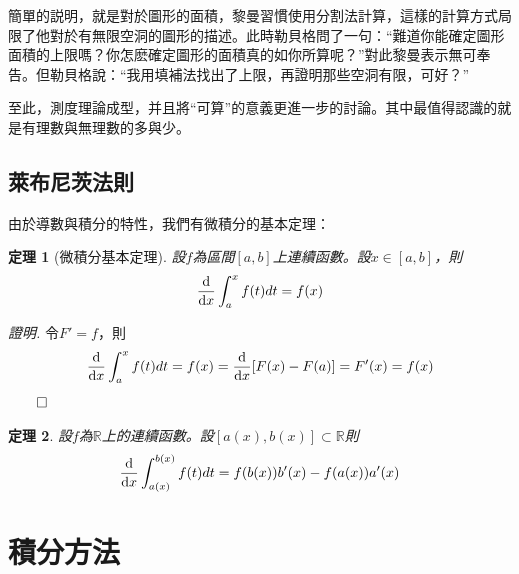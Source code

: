 \documentclass[12pt]{article}
\newtheorem*{theorem}{定理}
\renewenvironment*{proof}{\textit{證明.}}{\hfill$\qed$}
\begin{document}
    簡單的説明，就是對於圖形的面積，黎曼習慣使用分割法計算，這樣的計算方式局限了他對於有無限空洞的圖形的描述。此時勒貝格問了一句：“難道你能確定圖形面積的上限嗎？你怎麽確定圖形的面積真的如你所算呢？”對此黎曼表示無可奉告。但勒貝格說：“我用填補法找出了上限，再證明那些空洞有限，可好？”

    至此，測度理論成型，并且將“可算”的意義更進一步的討論。其中最值得認識的就是有理數與無理數的多與少。
    \subsection*{萊布尼茨法則}

    由於導數與積分的特性，我們有微積分的基本定理：

    \begin{theorem}[微積分基本定理]
        設$f$為區間$[a,b]$上連續函數。設$x\in[a,b]$，則$$\derivative{x}\int_{a}^{x} f(t) dt = f(x)$$
    \end{theorem}

    \begin{proof}
        令$F'=f$，則\begin{align*}
            \derivative{x}\int_{a}^{x} f(t) dt = f(x)=\derivative{x}[F(x)-F(a)]=F'(x)=f(x)
        \end{align*}
    \end{proof}

    \begin{theorem}
       設$f$為$\mathbb{R}$上的連續函數。設$[a(x),b(x)]\subset\mathbb{R}$則$$\derivative{x} \int_{a(x)}^{b(x)} f(t) dt = f(b(x))b'(x)-f(a(x))a'(x)$$
    \end{theorem}

    \section*{積分方法}
\end{document}
